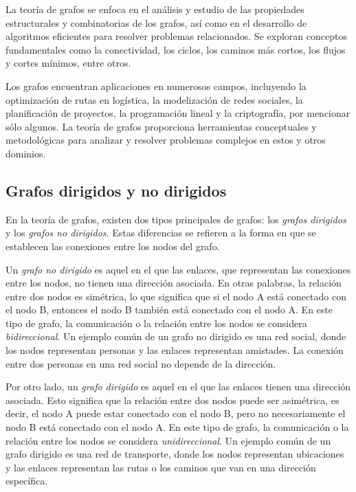 La teoría de grafos se enfoca en el análisis y estudio de las propiedades estructurales y combinatorias
de los grafos, así como en el desarrollo de algoritmos eficientes para resolver problemas relacionados.
Se exploran conceptos fundamentales como la conectividad, los ciclos, los caminos más cortos, los flujos
y cortes mínimos, entre otros.

Los grafos encuentran aplicaciones en numerosos campos, incluyendo la optimización de rutas en
logística, la modelización de redes sociales, la planificación de proyectos, la programación lineal
y la criptografía, por mencionar sólo algunos. La teoría de grafos proporciona herramientas conceptuales
y metodológicas para analizar y resolver problemas complejos en estos y otros dominios.

\subsection{Grafos dirigidos y no dirigidos}

En la teoría de grafos, existen dos tipos principales de grafos: los \textit{grafos dirigidos} y
los \textit{grafos no dirigidos}. Estas diferencias se
refieren a la forma en que se establecen las conexiones entre los nodos del grafo.

Un \textit{grafo no dirigido} es aquel en el que las enlaces, que representan las conexiones
entre los nodos, no tienen una dirección asociada. En otras palabras, la relación entre dos
nodos es simétrica, lo que significa que si el nodo A está conectado con el nodo B,
entonces el nodo B también está conectado con el nodo A. En este tipo de grafo, la comunicación
o la relación entre los nodos se considera \textit{bidireccional}. Un ejemplo común de un grafo no
dirigido es una red social, donde los nodos representan personas y las enlaces representan
amistades. La conexión entre dos personas en una red social no depende de la dirección.

Por otro lado, un \textit{grafo dirigido} es aquel en el que las enlaces tienen una dirección
asociada. Esto significa que la relación entre dos nodos puede ser asimétrica, es decir, el
nodo A puede estar conectado con el nodo B, pero no necesariamente el nodo B está conectado
con el nodo A. En este tipo de grafo, la comunicación o la relación entre los nodos se considera
\textit{unidireccional}. Un ejemplo común de un grafo dirigido es una red de transporte, donde los
nodos representan ubicaciones y las enlaces representan las rutas o los caminos que van en una
dirección específica.

